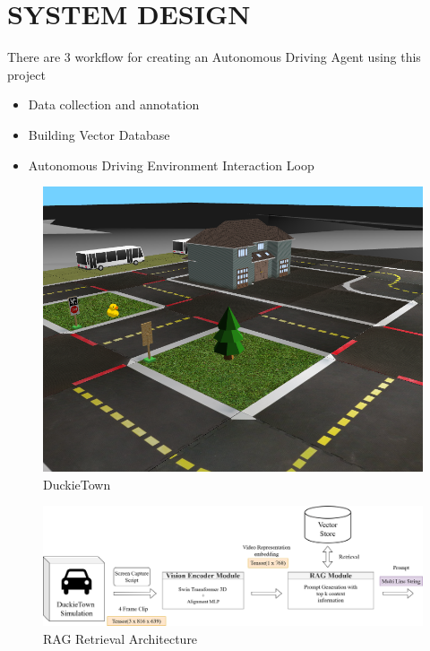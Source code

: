 
\chapter{\uppercase{System Design}} %
\label{ch:chap3} %
\begin{spacing}{1.5} 
\begin{sloppypar}
There are 3 workflow for creating an Autonomous Driving Agent using this project
\begin{itemize}
    \item Data collection and annotation
    \item Building Vector Database
    \item Autonomous Driving Environment Interaction Loop
\end{itemize}

\begin{figure}[h]
\begin{center}
\includegraphics[scale=0.5]{3/duckieTown.png}
\caption{DuckieTown}
\label{fig:DuckieTown}
\end{center}
\end{figure}



\begin{figure}
\begin{center}
\includegraphics[scale=0.28]{3/retrieval_rag.png}
\caption{RAG Retrieval Architecture}
\label{fig:archi}
\end{center}
\end{figure}


\end{sloppypar}
\end{spacing}
